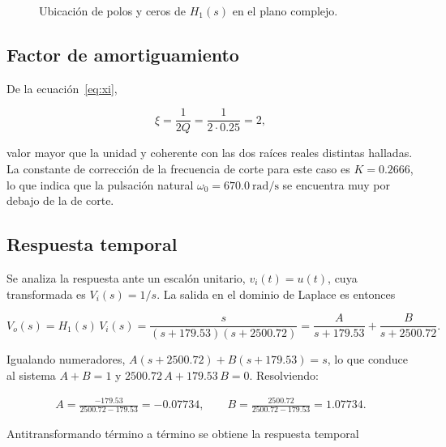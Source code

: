 \begin{figure}[!ht]
  \centering
  
  \caption{Ubicación de polos y ceros de $H_1(s)$ en el plano complejo.}
  \label{fig:polos-q025}
\end{figure}

\subsection{Factor de amortiguamiento}

De la ecuación~\eqref{eq:xi},

\begin{equation}
  \xi = \frac{1}{2Q} = \frac{1}{2 \cdot \num{0.25}} = 2,
  \label{eq:xi-q025}
\end{equation}

valor mayor que la unidad y coherente con las dos raíces reales distintas halladas. La constante de
corrección de la frecuencia de corte para este caso es $K = \num{0.2666}$, lo que indica que la pulsación
natural $\omega_0 = \qty{670.0}{\radian\per\second}$ se encuentra muy por debajo de la de corte.

\subsection{Respuesta temporal}

Se analiza la respuesta ante un escalón unitario, $v_i(t) = u(t)$, cuya transformada es
$V_i(s) = 1/s$. La salida en el dominio de Laplace es entonces

\begin{equation}
  V_o(s) = H_1(s)\, V_i(s)
         = \frac{s}{\left(s + \num{179.53}\right)\left(s + \num{2500.72}\right)}
         = \frac{A}{s + \num{179.53}} + \frac{B}{s + \num{2500.72}}.
  \label{eq:vo-q025}
\end{equation}

Igualando numeradores, $A\left(s + \num{2500.72}\right) + B\left(s + \num{179.53}\right) = s$, lo que
conduce al sistema $A + B = 1$ y $\num{2500.72}\,A + \num{179.53}\,B = 0$. Resolviendo:

\begin{gather*}
  A = \frac{\num{-179.53}}{\num{2500.72} - \num{179.53}} = \num{-0.07734}, \qquad
  B = \frac{\num{2500.72}}{\num{2500.72} - \num{179.53}} = \num{1.07734}.
\end{gather*}

Antitransformando término a término se obtiene la respuesta temporal

